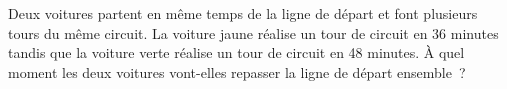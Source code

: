 %
%
Deux voitures partent en même temps de la ligne de départ et font plusieurs tours du même circuit. La voiture jaune réalise un tour de circuit en 36 minutes tandis que la voiture verte réalise un tour de circuit en 48 minutes. À quel moment les deux voitures vont-elles repasser la ligne de départ ensemble~?

